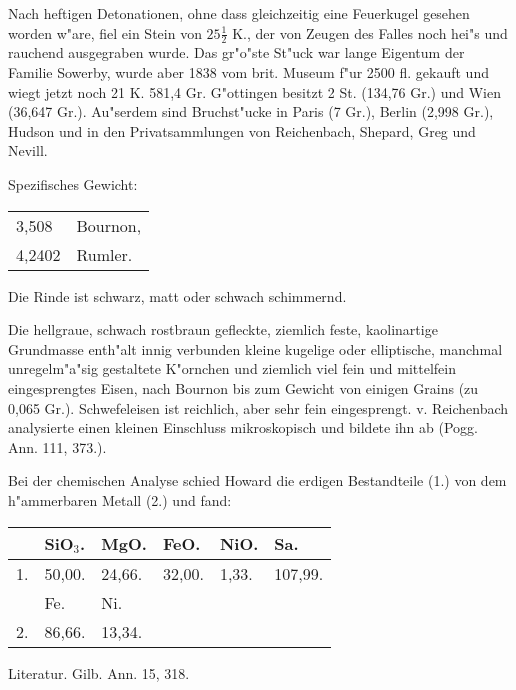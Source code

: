 \documentclass[a4paper, 11pt, oneside]{article}
\begin{document}
Nach heftigen Detonationen, ohne dass gleichzeitig eine Feuerkugel gesehen worden w"are, fiel ein Stein von $\mathfrak{25\frac{1}{2}}$ K., der von Zeugen des Falles noch hei"s und rauchend ausgegraben wurde. Das gr"o"ste St"uck war lange Eigentum der Familie Sowerby, wurde aber 1838 vom brit. Museum f"ur 2500 fl. gekauft und wiegt jetzt noch 21 K. 581,4 Gr. G"ottingen besitzt 2 St. (134,76 Gr.) und Wien (36,647 Gr.). Au"serdem sind Bruchst"ucke in Paris (7 Gr.), Berlin (2,998 Gr.), Hudson und in den Privatsammlungen von Reichenbach, Shepard, Greg und Nevill.

Spezifisches Gewicht:
\begin{table}[!ht]
    \centering\swabfamily\Large
    \begin{tabular}{l l}
        3,508 & Bournon,\\
        4,2402 & Rumler.
    \end{tabular}
\end{table}

Die Rinde ist schwarz, matt oder schwach schimmernd.

Die hellgraue, schwach rostbraun gefleckte, ziemlich feste, kaolinartige Grundmasse enth"alt innig verbunden kleine kugelige oder elliptische, manchmal unregelm"a"sig gestaltete K"ornchen und ziemlich viel fein und mittelfein eingesprengtes Eisen, nach Bournon bis zum Gewicht von einigen Grains (zu 0,065 Gr.). Schwefeleisen ist reichlich, aber sehr fein eingesprengt. v. Reichenbach analysierte einen kleinen Einschluss mikroskopisch und bildete ihn ab (Pogg. Ann. 111, 373.).

Bei der chemischen Analyse schied Howard die erdigen Bestandteile (1.) von dem h"ammerbaren Metall (2.) und fand:
\begin{table}[H]
    \centering\swabfamily\Large
    \begin{tabular}{l l l l l l}
         & SiO$_{3}$. & MgO. & FeO. & NiO. & Sa. \\ \hline
        1. & 50,00. & 24,66. & 32,00. & 1,33. & 107,99. \\
         & Fe. & Ni. &  &  &  \\
        2. & 86,66. & 13,34. &  &  &  \\
    \end{tabular}
\end{table}

\normalsize
Literatur. Gilb. Ann. 15, 318.
\subsection{}
\LARGE
\end{document}

